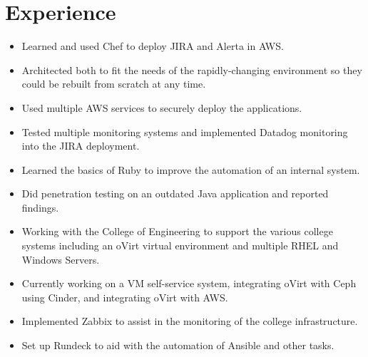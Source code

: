 \documentclass[]{deedy-resume-openfont}
\begin{document}
\begin{minipage}[t]{0.66\textwidth} 


\section{Experience}
\vspace{-1mm}
\begin{itemize}
  \itemsep-4pt
  \item Learned and used Chef to deploy JIRA and Alerta in AWS.
  \item Architected both to fit the needs of the rapidly-changing environment so they could be rebuilt from scratch at any time.
  \item Used multiple AWS services to securely deploy the applications.
  \item Tested multiple monitoring systems and implemented Datadog monitoring into the JIRA deployment.
  \item Learned the basics of Ruby to improve the automation of an internal system.
  \item Did penetration testing on an outdated Java application and reported findings.
\end{itemize}
\vspace{-4mm}
\sectionsep

\vspace{-3mm}
\begin{itemize}
  \itemsep-4pt
  \item Working with the College of Engineering to support the various college systems including an oVirt virtual environment and multiple RHEL and Windows Servers.
  \item Currently working on a VM self-service system, integrating oVirt with Ceph using Cinder, and integrating oVirt with AWS.
  \item Implemented Zabbix to assist in the monitoring of the college infrastructure.
  \item Set up Rundeck to aid with the automation of Ansible and other tasks.
\end{itemize}
\vspace{-4mm}
\sectionsep


\end{minipage}
\end{document}
